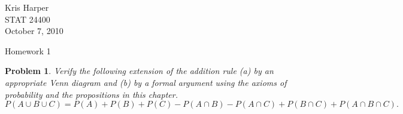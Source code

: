 \documentclass{article}
\newtheorem{problem}{Problem}
\begin{document}
\begin{flushright}
Kris Harper\\

STAT 24400\\

October 7, 2010
\end{flushright}

\begin{center}
Homework 1
\end{center}

\begin{problem}
Verify the following extension of the addition rule (a) by an appropriate Venn diagram and (b) by a formal argument using the axioms of probability and the propositions in this chapter.
\[
P(A \cup B \cup C) = P(A) + P(B) + P(C) - P(A \cap B) - P(A \cap C) + P(B \cap C) + P(A \cap B \cap C).
\]
\end{problem}
\end{document}
